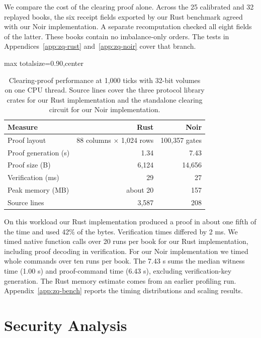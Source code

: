 We compare the cost of the clearing proof alone. Across the 25 calibrated and 32 replayed books, the six receipt fields exported by our Rust benchmark agreed with our Noir implementation. A separate recomputation checked all eight fields of the latter. These books contain no imbalance-only orders. The tests in Appendices~\ref{app:zq-rust} and~\ref{app:zq-noir} cover that branch.

\begin{table}[!tp]
\centering
\caption{Clearing-proof performance at 1,000 ticks with 32-bit volumes
on one CPU thread. Source lines cover the three protocol library crates
for our Rust implementation and the standalone clearing circuit for our
Noir implementation.}
\label{tab:rust-noir-clearing}
\setlength{\tabcolsep}{3pt}
\begin{adjustbox}{max totalsize={\linewidth}{0.90\textheight},center}
\begin{tabular}{@{}lrr@{}}
\toprule
Measure & Rust & Noir \\
\midrule
Proof layout         & 88 columns \(\times\) 1,024 rows & 100,357 gates \\
Proof generation (s) & 1.34     & 7.43   \\
Proof size (B)       & 6,124    & 14,656 \\
Verification (ms)    & 29       & 27     \\
Peak memory (MB)     & about 20 & 157    \\
Source lines         & 3,587    & 208    \\
\bottomrule
\end{tabular}
\end{adjustbox}
\end{table}

On this workload our Rust implementation produced a proof in about one fifth of the time and used 42\% of the bytes. Verification times differed by 2 ms. We timed native function calls over 20 runs per book for our Rust implementation, including proof decoding in verification. For our Noir implementation we timed whole commands over ten runs per book. The 7.43 s sums the median witness time (1.00 s) and proof-command time (6.43 s), excluding verification-key generation. The Rust memory estimate comes from an earlier profiling run. Appendix~\ref{app:zq-bench} reports the timing distributions and scaling results.


\section{Security Analysis}

